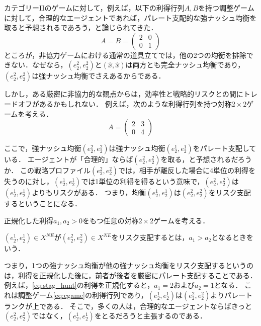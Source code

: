 \documentclass{jsreport}
\begin{document}
カテゴリーIIのゲームに対して，例えば，以下の利得行列$A, B$を持つ調整ゲームに対して，合理的なエージェントであれば，パレート支配的な強ナッシュ均衡を取ると予想されるであろう，と論じられてきた．
\begin{equation}
  A = B = \left(
  \begin{array}{cc}
    2 & 0 \\
    0 & 1
  \end{array}
  \right) \label{eq:cgame}
\end{equation}
ところが，非協力ゲームにおける通常の道具立てでは，他の2つの均衡を排除できない．なぜなら，$(e_2^2, e_2^2)$と$(\hat{x}, \hat{x})$は両方とも完全ナッシュ均衡であり，$(e_2^2, e_2^2)$は強ナッシュ均衡でさえあるからである．

しかし，ある厳密に非協力的な観点からは，効率性と戦略的リスクとの間にトレードオフがあるかもしれない．
例えば，次のような利得行列を持つ対称$2 \times 2$ゲームを考える．
\begin{equation}
  A = \left(
  \begin{array}{cc}
    2 & 3 \\
    0 & 4
  \end{array}
  \right)\label{eq:stag_hunt}
\end{equation}

ここで，強ナッシュ均衡$(e_2^2, e_2^2)$は強ナッシュ均衡$(e_2^1, e_2^1)$をパレート支配している．
エージェントが「合理的」ならば$(e_2^2, e_2^2)$を取る，と予想されるだろうか．
この戦略プロファイル$(e_2^2, e_2^2)$では，相手が離反した場合に4単位の利得を失うのに対し，$(e_2^1, e_2^1)$では1単位の利得を得るという意味で，$(e_2^2, e_2^2)$は$(e_2^1, e_2^1)$よりもリスクがある．
つまり，均衡$(e_2^1, e_2^1)$は$(e_2^2, e_2^2)$をリスク支配するということになる．

正規化した利得$a_1, a_2 > 0$をもつ任意の対称$2 \times 2$ゲームを考える．

\begin{screen}
  \begin{defi}
    $(e_2^1, e_2^1) \in X^{NE}$が$(e_2^2, e_2^2) \in X^{NE}$をリスク支配するとは，$a_1 > a_2$となるときをいう．
  \end{defi}
\end{screen}

つまり，1つの強ナッシュ均衡が他の強ナッシュ均衡をリスク支配するというのは，利得を正規化した後に，前者が後者を厳密にパレート支配することである．
例えば，\eqref{eq:stag_hunt}の利得を正規化すると，$a_1 = 2$および$a_2 = 1$となる．
これは調整ゲーム\eqref{eq:cgame}の利得行列であり，$(e_2^1, e_2^1)$は$(e_2^2, e_2^2)$よりパレートランクが上である．
そこで，多くの人は，合理的なエージェントならばきっと$(e_2^2, e_2^2)$ではなく，$(e_2^1, e_2^1)$をとるだろうと主張するのである．
\end{document}
